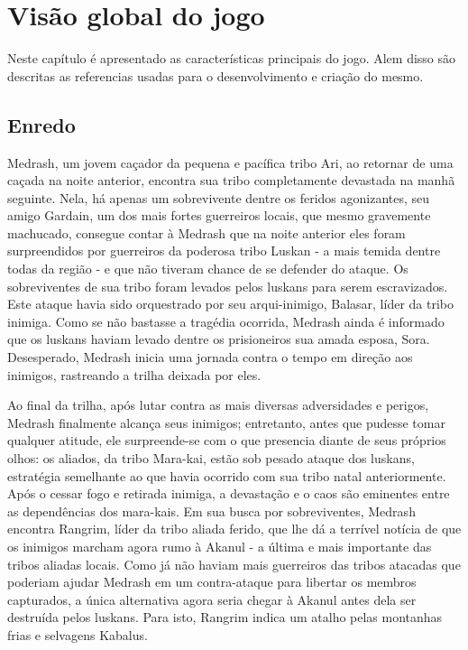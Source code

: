 \section{Visão global do jogo}

Neste capítulo é apresentado as características principais do jogo. 
Alem disso são descritas as referencias usadas para o desenvolvimento 
e criação do mesmo. 

\subsection{Enredo}
Medrash, um jovem caçador da pequena e pacífica tribo Ari, ao retornar de
 uma caçada na noite anterior, encontra sua tribo completamente devastada 
na manhã seguinte. Nela, há apenas um sobrevivente dentre os feridos
 agonizantes, seu amigo Gardain, um dos mais fortes guerreiros locais, que
 mesmo gravemente machucado, consegue contar à Medrash que na noite anterior
 eles foram surpreendidos por guerreiros da poderosa tribo Luskan - a mais
 temida dentre todas da região - e que não tiveram chance de se defender 
do ataque. Os sobreviventes de sua tribo foram levados pelos luskans para
 serem escravizados. Este ataque havia sido orquestrado por seu 
arqui-inimigo, Balasar, líder da tribo inimiga. Como se não bastasse a
 tragédia ocorrida, Medrash ainda é informado que os luskans haviam levado
 dentre os prisioneiros sua amada esposa, Sora.  Desesperado, Medrash 
inicia uma jornada contra o tempo em direção aos inimigos, rastreando 
a trilha deixada por eles. 

Ao final da trilha, após lutar contra as mais diversas adversidades e
 perigos, Medrash finalmente alcança seus inimigos; entretanto, antes que
 pudesse tomar qualquer atitude, ele  surpreende-se com o que presencia
 diante de seus próprios olhos: os aliados, da tribo Mara-kai, estão sob
 pesado ataque dos luskans, estratégia semelhante ao que havia ocorrido 
com sua tribo natal anteriormente. Após o cessar fogo e retirada inimiga,
 a devastação e o caos são eminentes entre as dependências dos mara-kais. 
Em sua busca por sobreviventes, Medrash encontra Rangrim, líder da tribo
 aliada ferido, que lhe dá a terrível notícia de que os inimigos marcham
 agora rumo à Akanul - a última e mais importante das tribos aliadas 
locais. Como já não haviam mais guerreiros das tribos atacadas que
 poderiam ajudar Medrash em um contra-ataque para libertar os membros
 capturados, a única alternativa agora seria chegar à Akanul antes dela 
ser destruída pelos luskans. Para isto, Rangrim indica um atalho pelas
 montanhas frias e selvagens Kabalus.
 
